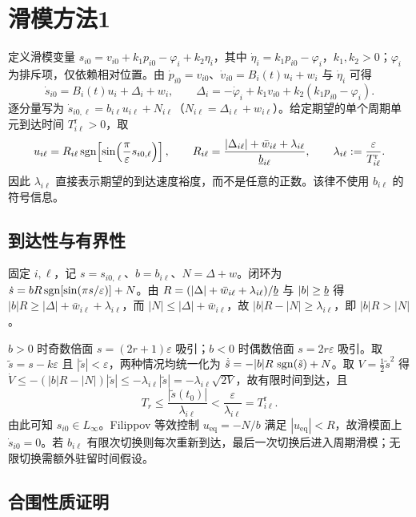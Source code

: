\section{滑模方法1}

定义滑模变量 $s_{i0}=v_{i0}+k_1p_{i0}-\varphi_i+k_2\eta_i$，其中 $\dot\eta_i=k_1p_{i0}-\varphi_i$，$k_1,k_2>0$；$\varphi_i$ 为排斥项，仅依赖相对位置。由 $\dot p_{i0}=v_{i0}$、$\dot v_{i0}=B_i(t)u_i+w_i$ 与 $\dot\eta_i$ 可得
\[
    \dot s_{i0}=B_i(t)u_i+\Delta_i+w_i,\qquad
    \Delta_i=-\dot\varphi_i+k_1v_{i0}+k_2(k_1p_{i0}-\varphi_i).
\]
逐分量写为 $\dot s_{i0,\ell}=b_{i\ell}u_{i\ell}+N_{i\ell}$（$N_{i\ell}=\Delta_{i\ell}+w_{i\ell}$）。给定期望的单个周期单元到达时间 $T^{\mathrm r}_{i\ell}>0$，取
\[
    u_{i\ell}=R_{i\ell}\operatorname{sgn}\!\left[\sin\!\left(\frac{\pi}{\varepsilon}s_{i0,\ell}\right)\right],\qquad
    R_{i\ell}=\frac{|\Delta_{i\ell}|+\bar w_{i\ell}+\lambda_{i\ell}}{\underline{b}_{i\ell}},
    \qquad
    \lambda_{i\ell}:=\frac{\varepsilon}{T^{\mathrm r}_{i\ell}}.
\]
因此 $\lambda_{i\ell}$ 直接表示期望的到达速度裕度，而不是任意的正数。该律不使用 $b_{i\ell}$ 的符号信息。

\subsection{到达性与有界性}

固定 $i,\ell$，记 $s=s_{i0,\ell}$、$b=b_{i\ell}$、$N=\Delta+w$。闭环为 $\dot s=bR\operatorname{sgn}[\sin(\pi s/\varepsilon)]+N$。由 $R=(|\Delta|+\bar w_{i\ell}+\lambda_{i\ell})/\underline{b}$ 与 $|b|\ge\underline{b}$ 得 $|b|R\ge|\Delta|+\bar w_{i\ell}+\lambda_{i\ell}$，而 $|N|\le|\Delta|+\bar w_{i\ell}$，故 $|b|R-|N|\ge\lambda_{i\ell}$，即 $|b|R>|N|$。

$b>0$ 时奇数倍面 $s=(2r+1)\varepsilon$ 吸引；$b<0$ 时偶数倍面 $s=2r\varepsilon$ 吸引。取 $\tilde s=s-k\varepsilon$ 且 $|\tilde s|<\varepsilon$，两种情况均统一化为 $\dot{\tilde s}=-|b|R\,\operatorname{sgn}(\tilde s)+N$。取 $V=\tfrac12\tilde s^2$ 得 $\dot V\le-(|b|R-|N|)|\tilde s|\le-\lambda_{i\ell}|\tilde s|=-\lambda_{i\ell}\sqrt{2V}$，故有限时间到达，且
\[
    T_r\le\frac{|\tilde s(t_0)|}{\lambda_{i\ell}}
    <\frac{\varepsilon}{\lambda_{i\ell}}=T^{\mathrm r}_{i\ell}.
\]
由此可知 $s_{i0}\in L_\infty$。Filippov 等效控制 $u_{\mathrm{eq}}=-N/b$ 满足 $|u_{\mathrm{eq}}|<R$，故滑模面上 $\dot s_{i0}=0$。若 $b_{i\ell}$ 有限次切换则每次重新到达，最后一次切换后进入周期滑模；无限切换需额外驻留时间假设。

\subsection{合围性质证明}

